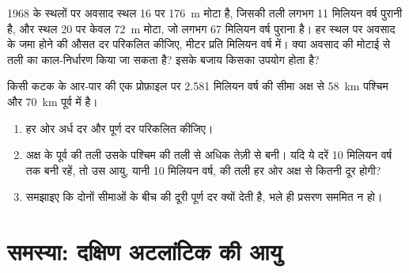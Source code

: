 \begin{exercise}[$\star\star\star$]\label{exo:g11:drift-to-spreading:14}
1968 के स्थलों पर अवसाद स्थल 16 पर \qty{176}{m} मोटा है, जिसकी तली
लगभग \num{11} मिलियन वर्ष पुरानी है, और स्थल 20 पर केवल \qty{72}{m} मोटा,
जो लगभग \num{67} मिलियन वर्ष पुराना है। हर स्थल पर अवसाद के जमा होने की औसत दर
परिकलित कीजिए, मीटर प्रति मिलियन वर्ष में। क्या
अवसाद की मोटाई से तली का काल-निर्धारण किया जा सकता है? इसके बजाय किसका उपयोग होता है?
\end{exercise}

\begin{exercise}[$\star\star\star$]\label{exo:g11:drift-to-spreading:15}
किसी कटक के आर-पार की एक प्रोफ़ाइल पर \num{2.581} मिलियन वर्ष की सीमा
अक्ष से \qty{58}{km} पश्चिम और \qty{70}{km} पूर्व में है।
\begin{enumerate}
  \item हर ओर अर्ध दर और पूर्ण दर परिकलित कीजिए।
  \item अक्ष के पूर्व की तली उसके पश्चिम की तली से अधिक तेज़ी से बनी।
        यदि ये दरें 10 मिलियन वर्ष तक बनी रहें, तो उस आयु, यानी 10 मिलियन
        वर्ष, की तली हर ओर अक्ष से कितनी दूर होगी?
  \item समझाइए कि दोनों सीमाओं के बीच की दूरी पूर्ण
        दर क्यों देती है, भले ही प्रसरण सममित न हो।
\end{enumerate}
\end{exercise}

\section{समस्या: दक्षिण अटलांटिक की आयु}

